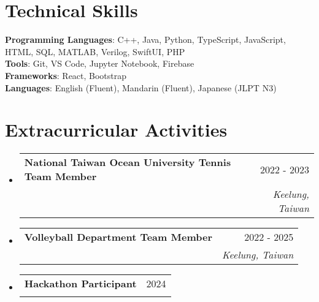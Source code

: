 \documentclass[letterpaper,11pt]{article}
\makeatletter
\newcommand{\resumeSubheading}[4]{
  \vspace{-2pt}\item
    \begin{tabular*}{0.97\textwidth}[t]{l@{\extracolsep{\fill}}r}
      \textbf{#1} & #2 \\
      \textit{\small#3} & \textit{\small #4} \\
    \end{tabular*}\vspace{-7pt}
}
\newcommand{\resumeSubHeadingListStart}{\begin{itemize}[leftmargin=0.15in, label={}]}
\newcommand{\resumeSubHeadingListEnd}{\end{itemize}}
\makeatother
\begin{document}
\section{Technical Skills}
 \begin{itemize}[leftmargin=0.15in, label={}]
    \small{\item{
     \textbf{Programming Languages}{: C++, Java, Python, TypeScript, JavaScript, HTML, SQL, MATLAB, Verilog, SwiftUI, PHP} \\
     \textbf{Tools}{: Git, VS Code, Jupyter Notebook, Firebase} \\
     \textbf{Frameworks}{: React, Bootstrap} \\
     \textbf{Languages}{: English (Fluent), Mandarin (Fluent), Japanese (JLPT N3)}
    }}
 \end{itemize}

\section{Extracurricular Activities}
    \resumeSubHeadingListStart
      \resumeSubheading
        {National Taiwan Ocean University Tennis Team Member}{2022 - 2023}{}{Keelung, Taiwan} %
      \resumeSubheading
        {Volleyball Department Team Member}{2022 - 2025}{}{Keelung, Taiwan} %
      \resumeSubheading
        {Hackathon Participant}{2024}{}{} 

    \resumeSubHeadingListEnd

\end{document}
